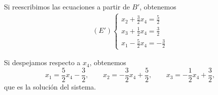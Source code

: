 \documentclass[handout]{beamer} %
\renewcommand{\_}[1]{_{\left[ #1 \right]}}
\renewcommand{\^}[1]{^{\left[ #1 \right]}}
\begin{document}
\begin{frame}
    Si reescribimos las ecuaciones a partir de $B'$, obtenemos\pause
    \begin{align*}
    (E')
    \left\{
    \begin{array}{l}
    x_2+\frac{3}{2}x_4=\frac{5}{2}\\[1.0ex]
    x_3+\frac{1}{2}x_4=\frac{3}{2}\\[1.0ex]
    x_1-\frac{5}{2}x_4=-\frac{3}{2}
    \end{array}
    \right.
    \end{align*}
    
    Si despejamos respecto a $x_4$, obtenemos \pause
    \begin{equation*}
    x_1=\frac{5}{2}x_4-\frac{3}{2}, \qquad 
            x_2=-\frac{3}{2}x_4+\frac{5}{2}, \qquad 
        x_3=-\frac{1}{2}x_4+\frac{3}{2},
    \end{equation*}
    que es la solución del sistema. 
    
\end{frame}
\end{document}
